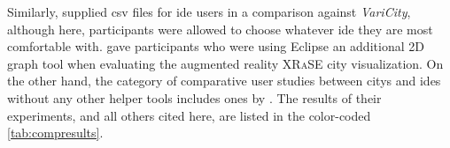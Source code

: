 \documentclass[../thesis]{subfiles}
\begin{document}
Similarly, \textcite{mortara2024} supplied \gls{csv} files for \gls{ide} users in a comparison against \emph{VariCity}, although here, participants were allowed to choose whatever \gls{ide} they are most comfortable with.
\textcite{mehra2020} gave participants who were using Eclipse an additional 2D graph tool when evaluating the augmented reality \textsc{XRaSE} \gls{city} visualization.
On the other hand, the category of comparative user studies between \glspl{city} and \glspl{ide} without any other helper tools includes ones by \textcite{khaloo2017,galperin2022,lennartkipka2020}.
The results of their experiments, and all others cited here, are listed in the color-coded \cref{tab:compresults}.



\newcommand{\reside}[1]{\cellcolor{Blue}\textcolor{White}{#1}}
\newcommand{\rescc}[1]{\cellcolor{Maroon}\textcolor{White}{#1}}
\newcommand{\residel}[1]{\cellcolor{LightBlue}#1}  %
\newcommand{\resccl}[1]{\cellcolor{LightMaroon}#1}
\newcommand{\resmixed}[1]{\cellcolor{Goldenrod}#1}  %
\newcommand{\resnone}[1]{\cellcolor{Gray!70!white}No diff.}  %
\newcommand{\resna}[1]{\textcolor{Gray}{\textit{N/A}}}
\end{document}
